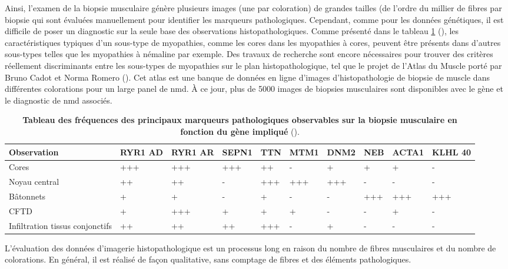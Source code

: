 Ainsi, l'examen de la biopsie musculaire génère plusieurs images (une par coloration) de grandes tailles (de l'ordre du millier de fibres par biopsie qui sont évaluées manuellement pour identifier les marqueurs pathologiques. Cependant, comme pour les données génétiques, il est difficile de poser un diagnostic sur la seule base des observations histopathologiques. Comme présenté dans le tableau \ref{tab:histopath} (\cite{jungbluth_congenital_2018}), les caractéristiques typiques d'un sous-type de myopathies, comme les cores dans les myopathies à cores, peuvent être présents dans d'autres sous-types telles que les myopathies à némaline par exemple. Des travaux de recherche sont encore nécessaires pour trouver des critères réellement discriminants entre les sous-types de myopathies sur le plan histopathologique, tel que le projet de l'Atlas du Muscle porté par Bruno Cadot et Norma Romero (\cite{cadot_atlas_2022}). Cet atlas est une banque de données en ligne d'images d'histopathologie de biopsie de muscle dans différentes colorations pour un large panel de \gls{nmd}. À ce jour, plus de 5000 images de biopsies musculaires sont disponibles avec le gène et le diagnostic de \gls{nmd} associés. 

\begin{table}[!ht]
\begin{tabularx}{\textwidth}{|p{1.8cm}|X|X|X|X|X|X|X|X|X|}
 \hline
\textbf{Observation} & \textbf{RYR1 AD} & \textbf{RYR1 AR} & \textbf{SEPN1} & \textbf{TTN} & \textbf{MTM1} & \textbf{DNM2} & \textbf{NEB} & \textbf{ACTA1} & \textbf{KLHL 40} \\
\hline
Cores & +++ & +++ & +++ & ++ & - & + & + & + & - \\
\hline
Noyau central & ++ & ++ & - & +++ & +++ & +++ & - & - & - \\
\hline
Bâtonnets & + & + & - & + & - & - & +++ & +++ & +++ \\
\hline
CFTD & + & +++ & + & + & + & - & - & + & - \\
\hline
Infiltration tissus conjonctifs & ++ & ++ & ++ & +++ & - & + & - & - & - \\
\hline
\end{tabularx}
\caption[Tableau des fréquences des principaux marqueurs pathologiques en biopsie musculaire.]{\textbf{Tableau des fréquences des principaux marqueurs pathologiques observables sur la biopsie musculaire en fonction du gène impliqué} (\cite{jungbluth_congenital_2018}). }
\label{tab:histopath}
\end{table}
L'évaluation des données d'imagerie histopathologique est un processus long en raison du nombre de fibres musculaires et du nombre de colorations. En général, il est réalisé de façon qualitative, sans comptage de fibres et des éléments pathologiques.

